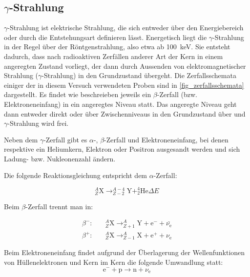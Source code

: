 \documentclass[
	a4paper,
	12pt,
	pagesize,
	ngerman
]{scrartcl}
\begin{document}
	\subsection{$\gamma$-Strahlung}
	$\gamma$-Strahlung ist elektrische Strahlung, die sich entweder über den Energiebereich oder durch die Entstehungsart definieren lässt.
	Energetisch liegt die $\gamma$-Strahlung in der Regel über der Röntgenstrahlung, also etwa ab \SI{100}{keV}.
	Sie entsteht dadurch, dass nach radioaktiven Zerfällen anderer Art der Kern in einem angeregten Zustand vorliegt, der dann durch Aussenden von elektromagnetischer Strahlung ($\gamma$-Strahlung) in den Grundzustand übergeht.
	Die Zerfallsschemata einiger der in diesem Versuch verwendeten Proben sind in \cref{fig_zerfallsschemata} dargestellt.
	Es findet wie beschreieben jeweils ein $\beta$-Zerfall (bzw. Elektroneneinfang) in ein angeregtes Niveau statt.
	Das angeregte Niveau geht dann entweder direkt oder über Zwischenniveaus in den Grundzustand über und $\gamma$-Strahlung wird frei.

	Neben dem $\gamma$-Zerfall gibt es $\alpha$-, $\beta$-Zerfall und Elektroneneinfang, bei denen respektive ein Heliumkern, Elektron oder Positron ausgesandt werden und sich Ladung- bzw. Nukleonenzahl ändern.

	Die folgende Reaktionsgleichung entspricht dem $\alpha$-Zerfall:

	\begin{equation}
		\label{eq_alphazerfall}
		 _{Z}^{A}\text{X} \rightarrow _{Z-2}^{A-4}\text{Y} + _{2}^{4}\text{He} \Delta E
	\end{equation}

	Beim $\beta$-Zerfall trennt man in:

	\begin{align}
		\label{eq_beta-minus}
		\beta^-: \quad & _{Z}^{A}\text{X} \rightarrow _{Z+1}^{A}\text{Y} + \text{e}^- + \bar{\nu_{\text{e}}}\\
		\beta^+: \quad & _{Z}^{A}\text{X} \rightarrow _{Z-1}^{A}\text{X} + \text{e}^+ + \nu_{\text{e}}
	\end{align}

	Beim Elektroneneinfang findet aufgrund der Überlagerung der Wellenfunktionen von Hüllenelektronen und Kern im Kern die folgende Umwandlung statt:
	\begin{equation}
		\label{eq_elec_cap}
		\text{e}^- + \text{p} \rightarrow \text{n} + \nu_{\text{e}}
	\end{equation}
\end{document}
